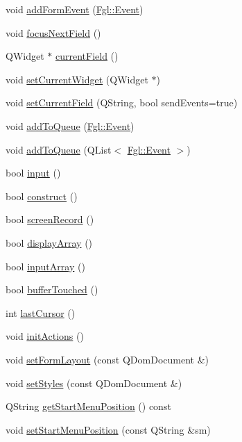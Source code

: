 \begin{DoxyCompactItemize}
\item 
void \hyperlink{classFglForm_abadbd33d56f9bc46b3421f8fe0628952}{addFormEvent} (\hyperlink{structFgl_1_1Event}{Fgl::Event})
\item 
void \hyperlink{classFglForm_a5f3fea57cf46e7d548912efdaffa35f9}{focusNextField} ()
\item 
QWidget $\ast$ \hyperlink{classFglForm_a74cb6310512352e1fd501efbcd88724b}{currentField} ()
\item 
void \hyperlink{classFglForm_ac521356370affcf115340e2279475c6b}{setCurrentWidget} (QWidget $\ast$)
\item 
void \hyperlink{classFglForm_a4574756e714c6d93e6d177ecbfb78ae1}{setCurrentField} (QString, bool sendEvents=true)
\item 
void \hyperlink{classFglForm_a82a066a47d5d8bc2f7c2ec41ab29d4f2}{addToQueue} (\hyperlink{structFgl_1_1Event}{Fgl::Event})
\item 
void \hyperlink{classFglForm_a21e6b7f851487d6d0db29b015a37e374}{addToQueue} (QList$<$ \hyperlink{structFgl_1_1Event}{Fgl::Event} $>$)
\item 
bool \hyperlink{classFglForm_ab6b474ce22c93c45ccbee4b637647732}{input} ()
\item 
bool \hyperlink{classFglForm_ab131183405b70a2d48643ec9a522f877}{construct} ()
\item 
bool \hyperlink{classFglForm_a2e45f9d338ef208ffb1c08f1f97e6b2b}{screenRecord} ()
\item 
bool \hyperlink{classFglForm_a77b1a70cf1fff7d103b8c1895b3302c4}{displayArray} ()
\item 
bool \hyperlink{classFglForm_a452b19a215f6acbb86320ed3a8b32ead}{inputArray} ()
\item 
bool \hyperlink{classFglForm_ae6cab599f897bf58335df99e6d43b72d}{bufferTouched} ()
\item 
int \hyperlink{classFglForm_aab860a48ab46e95732543f3cb345ba26}{lastCursor} ()
\item 
void \hyperlink{classFglForm_af5e8206054e3275e2977056e685b73da}{initActions} ()
\item 
void \hyperlink{classFglForm_a6a923c50e859e58d34046d0b0f86c11d}{setFormLayout} (const QDomDocument \&)
\item 
void \hyperlink{classFglForm_a07c0926396e4229b40de7988689a1f16}{setStyles} (const QDomDocument \&)
\item 
QString \hyperlink{classFglForm_a40002405b99f9291e8f61944a775172a}{getStartMenuPosition} () const 
\item 
void \hyperlink{classFglForm_a2badc0486f40c57306fdefe14800a13b}{setStartMenuPosition} (const QString \&sm)

\end{DoxyCompactItemize}
